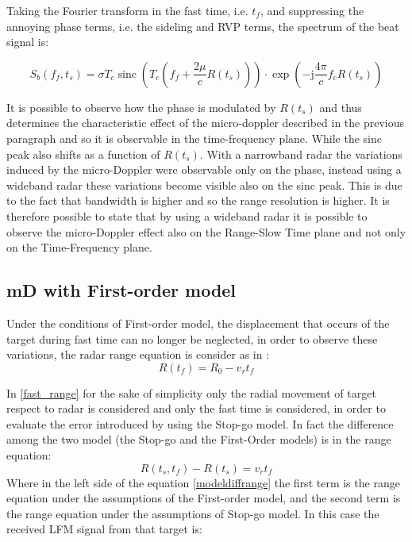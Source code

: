 Taking the Fourier transform in the fast time, i.e. $t_{f}$, and suppressing the annoying phase terms, i.e.  the sideling and RVP terms, the spectrum of the beat signal is:

\begin{equation}
S_{b}\left(f_{f}, t_{s}\right)=\sigma T_{c} \operatorname{sinc}\left(T_{c}\left(f_{f}+\frac{2 \mu}{c} R\left(t_{s}\right)\right)\right) \cdot \exp \left(-\mathrm{j} \frac{4 \pi}{c} f_{c} R\left(t_{s}\right)\right)
\end{equation}

It is possible to observe how the phase is modulated by $R(t_{s})$ and thus determines the characteristic effect of the micro-doppler described in the previous paragraph and so it is observable in the time-frequency plane. While the sinc peak also shifts as a function of $R(t_{s})$. With a narrowband radar the variations induced by the micro-Doppler were observable only on the phase, instead using a wideband radar these variations become visible also on the sinc peak. This is due to the fact that bandwidth is higher and so the range resolution is higher. It is therefore possible to state that by using a wideband radar it is possible to observe the micro-Doppler effect also on the Range-Slow Time plane and not only on the Time-Frequency plane.

\subsection{mD with First-order model}
Under the conditions of First-order model, the displacement that occurs of the target during fast time can no longer be neglected, in order to observe these variations, the radar range equation is consider as in \cite{chen_chinese}:
\begin{equation}
R(t_{f}) = R_{0} - v_{r} t_{f}
\label{fast_range}
\end{equation}

In \ref{fast_range} for the sake of simplicity only the radial movement of target respect to radar is considered and only the fast time is considered, in order to evaluate the error introduced by using the Stop-go model. In fact the difference among the two model (the Stop-go and the First-Order models) is in the range equation:
\begin{equation}
    R(t_{s},t_{f}) - R(t_{s}) = v_{r}t_{f}
    \label{modeldiffrange}
\end{equation}
Where in the left side of the equation \ref{modeldiffrange} the first term is the range equation under the assumptions of the First-order model, and the second term is the range equation under the assumptions of Stop-go model.
In this case the received LFM signal from that target is:

